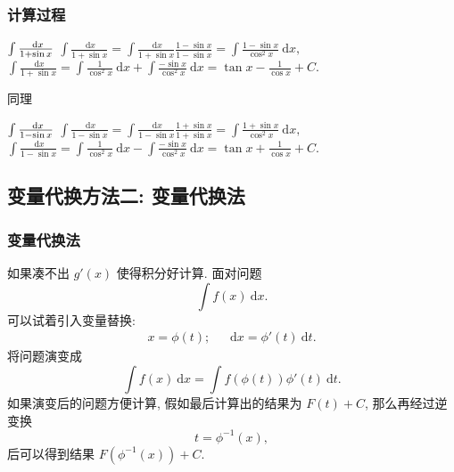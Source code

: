 \documentclass[
10pt,
aspectratio=43,
]{beamer}
\begin{document}
\begin{frame}
	\frametitle{计算过程}
	\everymath{\displaystyle}
	\begin{exampleblock}{$\color{black}\int \frac{\mathrm{~d} x}{1+\sin x}$}
		$
			\int \frac{\mathrm{~d} x}{1+\sin x}=\int \frac{\mathrm{~d} x}{1+\sin x}\frac{1-\sin x}{1-\sin x}=\int \frac{1-\sin x}{\cos^2 x}\mathrm{~d} x,
		$
		$
			\int \frac{\mathrm{~d} x}{1+\sin x}=\int \frac{1}{\cos^2 x}\mathrm{~d}x + \int \frac{-\sin x}{\cos^2 x}\mathrm{~d}x=\tan x -\frac{1}{\cos x} +C.
		$
	\end{exampleblock}
	\pause
	同理
	\begin{exampleblock}{$\color{black}\int \frac{\mathrm{~d} x}{1-\sin x}$}
		$
			\int \frac{\mathrm{~d} x}{1-\sin x}=\int \frac{\mathrm{~d} x}{1-\sin x}\frac{1+\sin x}{1+\sin x}=\int \frac{1+\sin x}{\cos^2 x}\mathrm{~d} x,
		$
		$
			\int \frac{\mathrm{~d} x}{1-\sin x}=\int \frac{1}{\cos^2 x}\mathrm{~d}x - \int \frac{-\sin x}{\cos^2 x}\mathrm{~d}x=\tan x +\frac{1}{\cos x} +C.
		$
	\end{exampleblock}
\end{frame}

\subsection{变量代换方法二: 变量代换法}

\begin{frame}
	\frametitle{变量代换法}
	\everymath{\displaystyle}
	如果凑不出 $g'(x)$ 使得积分好计算.
	面对问题
	$$
		\int f(x)\mathrm{~d}x.
	$$
	可以试着引入变量替换:
	$$
		\begin{aligned}
			x=\phi(t);\,\,\,\, \,\,\,\,\mathrm{~d}x=\phi'(t)\mathrm{~d}t.
		\end{aligned}
	$$
	将问题演变成
	$$
		\int f(x)\mathrm{~d}x=\int f(\phi(t))\phi'(t)\mathrm{~d}t.
	$$
	如果演变后的问题方便计算, 假如最后计算出的结果为 $F(t)+C$, 那么再经过逆变换
	$$
		t=\phi^{-1}(x),
	$$
	后可以得到结果 $F(\phi^{-1}(x))+C$.
\end{frame}
\end{document}
